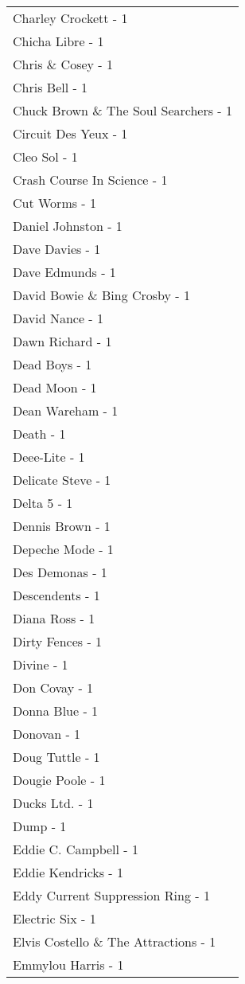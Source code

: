 \documentclass[
]{article}
\begin{document}
\begin{longtable}{l}
Charley Crockett - 1 \\ 
Chicha Libre - 1 \\ 
Chris \& Cosey - 1 \\ 
Chris Bell - 1 \\ 
Chuck Brown \& The Soul Searchers - 1 \\ 
Circuit Des Yeux - 1 \\ 
Cleo Sol - 1 \\ 
Crash Course In Science - 1 \\ 
Cut Worms - 1 \\ 
Daniel Johnston - 1 \\ 
Dave Davies - 1 \\ 
Dave Edmunds - 1 \\ 
David Bowie \& Bing Crosby - 1 \\ 
David Nance - 1 \\ 
Dawn Richard - 1 \\ 
Dead Boys - 1 \\ 
Dead Moon - 1 \\ 
Dean Wareham - 1 \\ 
Death - 1 \\ 
Deee-Lite - 1 \\ 
Delicate Steve - 1 \\ 
Delta 5 - 1 \\ 
Dennis Brown - 1 \\ 
Depeche Mode - 1 \\ 
Des Demonas - 1 \\ 
Descendents - 1 \\ 
Diana Ross - 1 \\ 
Dirty Fences - 1 \\ 
Divine - 1 \\ 
Don Covay - 1 \\ 
Donna Blue - 1 \\ 
Donovan - 1 \\ 
Doug Tuttle - 1 \\ 
Dougie Poole - 1 \\ 
Ducks Ltd. - 1 \\ 
Dump - 1 \\ 
Eddie C. Campbell - 1 \\ 
Eddie Kendricks - 1 \\ 
Eddy Current Suppression Ring - 1 \\ 
Electric Six - 1 \\ 
Elvis Costello \& The Attractions - 1 \\ 
Emmylou Harris - 1 \\ 

\end{longtable}
\end{document}
